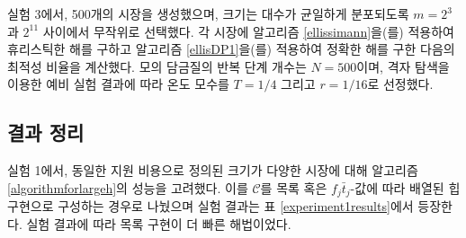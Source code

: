 \documentclass[11pt]{article} %
\newif\ifen
\theoremstyle{definition}
\theoremstyle{definition}
\begin{document}
\ifen
In Experiment 3, we generated 500 markets with sizes varying uniformly in the logarithm between $m = 2^3$ and $2^{11}$. For each market, we computed a heuristic solution using Algorithm \ref{ellissimann} and an exact solution using Algorithm \ref{ellisDP1} and calculated the optimality ratio. We chose to use $N = 500$ iterations in the simulated-annealing algorithm, and the temperature parameters $T = 1/4$ and $r = 1/16$ were selected by a preliminary grid search.  
\else
실험 3에서, 500개의 시장을 생성했으며, 크기는 대수가 균일하게 분포되도록 $m = 2^3$과 $2^{11}$ 사이에서 무작위로 선택했다. 각 시장에 알고리즘 \ref{ellissimann}을(를) 적용하여 휴리스틱한 해를 구하고 알고리즘 \ref{ellisDP1}을(를) 적용하여 정확한 해를 구한 다음의 최적성 비율을 계산했다. 모의 담금질의 반복 단계 개수는 $N = 500$이며, 격자 탐색을 이용한 예비 실험 결과에 따라 온도 모수를 $T = 1/4$ 그리고 $r = 1/16$로 선정했다.
\fi

\ifen \subsection{Summary of results} \else \subsection{결과 정리}\fi
\ifen
Experiment 1 compared the performance of Algorithm \ref{algorithmforlargeh} for homogeneous-cost markets of various sizes when the set of candidate schools $\mathcal{C}$ is stored as a list and as a binary max heap ordered by the $f_j \bar t_j$-values. The results appear in Table \ref{experiment1results}. Our results indicate that the list implementation is faster. %
\else
실험 1에서, 동일한 지원 비용으로 정의된 크기가 다양한 시장에 대해 알고리즘 \ref{algorithmforlargeh}의 성능을 고려했다. 이를 $\mathcal{C}$를 목록 혹은 $f_j \bar t_j$-값에 따라 배열된 힙 구현으로 구성하는 경우로 나눴으며 실험 결과는 표 \ref{experiment1results}에서 등장한다. 실험 결과에 따라 목록 구현이 더 빠른 해법이었다. %
\fi
\end{document}
